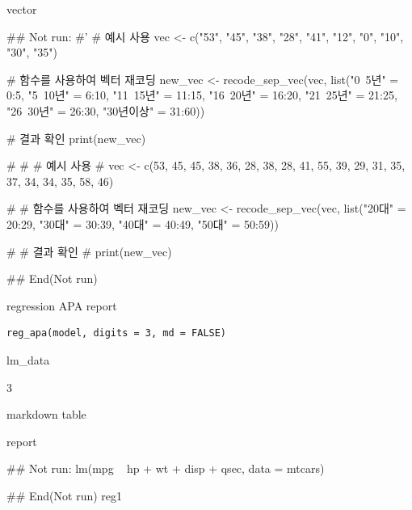\documentclass[a4paper]{book}
\begin{document}
%
\begin{Value}
vector
\end{Value}
%
\begin{Examples}
\begin{ExampleCode}
\#\# Not run: 
#'
# 예시 사용
vec <- c("53", "45", "38", "28", "41", "12", "0", "10", "30", "35")

# 함수를 사용하여 벡터 재코딩
new_vec <- recode_sep_vec(vec, list("0~5년" = 0:5,
                                    "5~10년" = 6:10,
                                    "11~15년" = 11:15,
                                    "16~20년" = 16:20,
                                    "21~25년" = 21:25,
                                    "26~30년" = 26:30,
                                    "30년이상" = 31:60))

# 결과 확인
print(new_vec)

# # # 예시 사용
# vec <- c(53, 45, 45, 38, 36, 28, 38, 28, 41, 55, 39, 29, 31, 35, 37, 34, 34, 35, 58, 46)

# # 함수를 사용하여 벡터 재코딩
new_vec <- recode_sep_vec(vec, list("20대" = 20:29, "30대" = 30:39, "40대" = 40:49, "50대" = 50:59))

# # 결과 확인
# print(new_vec)

## End(Not run)


\end{ExampleCode}
\end{Examples}
%
\begin{Description}
regression APA report
\end{Description}
%
\begin{Usage}
\begin{verbatim}
reg_apa(model, digits = 3, md = FALSE)
\end{verbatim}
\end{Usage}
%
\begin{Arguments}
\begin{ldescription}
\item[\code{model}] lm\_data

\item[\code{digits}] 3

\item[\code{md}] markdown table
\end{ldescription}
\end{Arguments}
%
\begin{Value}
report
\end{Value}
%
\begin{Examples}
\begin{ExampleCode}
\#\# Not run: 
lm(mpg ~ hp + wt + disp + qsec, data = mtcars) %

## End(Not run)
reg1
\end{ExampleCode}
\end{Examples}
\end{document}
